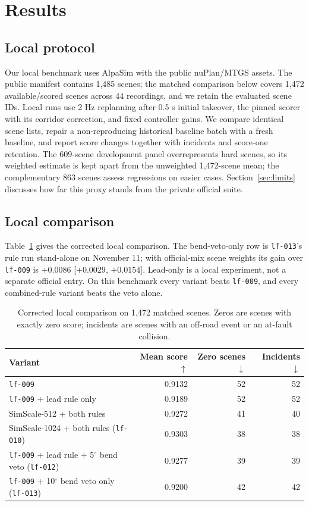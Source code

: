 \documentclass{article}
\newcommand{\lf}{\texttt{lf-009}}
\begin{document}
\section{Results}\label{sec:results}
\subsection{Local protocol}
Our local benchmark uses AlpaSim with the public nuPlan/MTGS assets. The public manifest contains 1,485 scenes; the matched comparison below covers 1,472 available/scored scenes across 44 recordings, and we retain the evaluated scene IDs. Local runs use 2 Hz replanning after 0.5 s initial takeover, the pinned scorer with its corridor correction, and fixed controller gains. We compare identical scene lists, repair a non-reproducing historical baseline batch with a fresh baseline, and report score changes together with incidents and score-one retention. The 609-scene development panel overrepresents hard scenes, so its weighted estimate is kept apart from the unweighted 1,472-scene mean; the complementary 863 scenes assess regressions on easier cases. Section~\ref{sec:limits} discusses how far this proxy stands from the private official suite.

\subsection{Local comparison}
Table~\ref{tab:local} gives the corrected local comparison. The bend-veto-only row is \texttt{lf-013}'s rule run stand-alone on November 11; with official-mix scene weights its gain over \lf{} is $+0.0086$ [$+0.0029$, $+0.0154$]. Lead-only is a local experiment, not a separate official entry. On this benchmark every variant beats \lf{}, and every combined-rule variant beats the veto alone.

\begin{table}[htbp]
\centering\small
\caption{Corrected local comparison on 1,472 matched scenes. Zeros are scenes with exactly zero score; incidents are scenes with an off-road event or an at-fault collision.}\label{tab:local}
\begin{tabular}{lrrr}
\toprule
Variant & Mean score $\uparrow$ & Zero scenes $\downarrow$ & Incidents $\downarrow$ \\
\midrule
\lf{} & 0.9132 & 52 & 52 \\
\lf{} + lead rule only & 0.9189 & 52 & 52 \\
SimScale-512 + both rules & 0.9272 & 41 & 40 \\
SimScale-1024 + both rules (\texttt{lf-010}) & 0.9303 & 38 & 38 \\
\lf{} + lead rule + 5$^\circ$ bend veto (\texttt{lf-012}) & 0.9277 & 39 & 39 \\
\lf{} + 10$^\circ$ bend veto only (\texttt{lf-013}) & 0.9200 & 42 & 42 \\
\bottomrule
\end{tabular}
\end{table}
\end{document}
